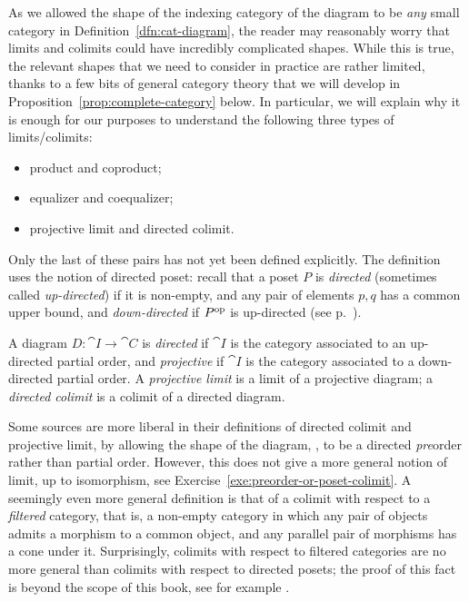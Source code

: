As we allowed the shape of the indexing category of the diagram to be \emph{any}
small category in Definition~\ref{dfn:cat-diagram}, the reader may reasonably
worry that limits and colimits could have incredibly complicated shapes. While
this is true, the relevant shapes that we need to consider in practice are
rather limited, thanks to a few bits of general category theory that we will develop in Proposition~\ref{prop:complete-category} below.
In particular, we will explain why it is
enough for our purposes to understand the following three types of limits/colimits:
\begin{itemize}
\item product and coproduct;
\item equalizer and coequalizer;
\item projective limit and directed colimit.
\end{itemize}
Only the last of these pairs has not yet been defined explicitly. The definition
uses the notion of directed poset: recall that a poset $P$ is \emph{directed} (sometimes called \emph{up-directed})
if it is non-empty, and any pair of elements $p, q$ has a common upper bound,
and \emph{down-directed} if $P^{\mathrm{op}}$ is up-directed (see
p.~\pageref{def:directed}).  
\begin{definition}
A diagram $D \colon \cat{I} \to \cat{C}$  is \emph{directed} if $\cat{I}$ is the category associated to an up-directed partial order, and \emph{projective} if $\cat{I}$ is the category associated to a down-directed partial order. 
A \emph{projective limit} is a limit of a projective diagram; a \emph{directed colimit} is a colimit of a directed diagram. 
\end{definition}
Some sources are more liberal in their definitions of directed colimit and
projective limit, by allowing the shape of the diagram, , to be a
directed \emph{pre}order rather than partial order. However, this does not give
a more general notion of limit, up to isomorphism, see
Exercise~\ref{exe:preorder-or-poset-colimit}. A seemingly even more general definition is that of a colimit with respect to a \emph{filtered} category, that is, a non-empty category in which any pair of objects admits a morphism to a common object, and any parallel pair of morphisms has a cone under it. Surprisingly, colimits with respect to filtered categories are no more general than  colimits with respect to directed posets; the proof of this fact is beyond the scope of this book, see for example \cite[Theorem 1.5]{AdaRos1994}. 
 

